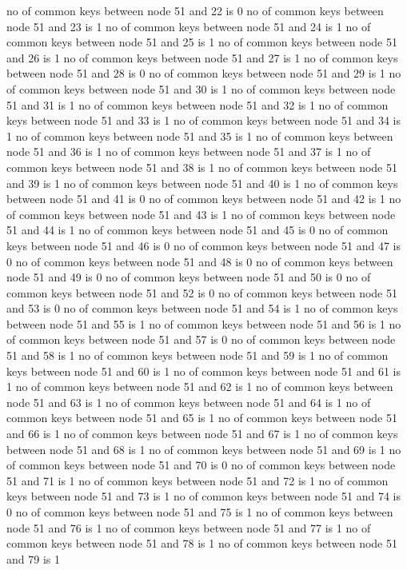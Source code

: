 no of common keys between node 51 and 22 is 0
no of common keys between node 51 and 23 is 1
no of common keys between node 51 and 24 is 1
no of common keys between node 51 and 25 is 1
no of common keys between node 51 and 26 is 1
no of common keys between node 51 and 27 is 1
no of common keys between node 51 and 28 is 0
no of common keys between node 51 and 29 is 1
no of common keys between node 51 and 30 is 1
no of common keys between node 51 and 31 is 1
no of common keys between node 51 and 32 is 1
no of common keys between node 51 and 33 is 1
no of common keys between node 51 and 34 is 1
no of common keys between node 51 and 35 is 1
no of common keys between node 51 and 36 is 1
no of common keys between node 51 and 37 is 1
no of common keys between node 51 and 38 is 1
no of common keys between node 51 and 39 is 1
no of common keys between node 51 and 40 is 1
no of common keys between node 51 and 41 is 0
no of common keys between node 51 and 42 is 1
no of common keys between node 51 and 43 is 1
no of common keys between node 51 and 44 is 1
no of common keys between node 51 and 45 is 0
no of common keys between node 51 and 46 is 0
no of common keys between node 51 and 47 is 0
no of common keys between node 51 and 48 is 0
no of common keys between node 51 and 49 is 0
no of common keys between node 51 and 50 is 0
no of common keys between node 51 and 52 is 0
no of common keys between node 51 and 53 is 0
no of common keys between node 51 and 54 is 1
no of common keys between node 51 and 55 is 1
no of common keys between node 51 and 56 is 1
no of common keys between node 51 and 57 is 0
no of common keys between node 51 and 58 is 1
no of common keys between node 51 and 59 is 1
no of common keys between node 51 and 60 is 1
no of common keys between node 51 and 61 is 1
no of common keys between node 51 and 62 is 1
no of common keys between node 51 and 63 is 1
no of common keys between node 51 and 64 is 1
no of common keys between node 51 and 65 is 1
no of common keys between node 51 and 66 is 1
no of common keys between node 51 and 67 is 1
no of common keys between node 51 and 68 is 1
no of common keys between node 51 and 69 is 1
no of common keys between node 51 and 70 is 0
no of common keys between node 51 and 71 is 1
no of common keys between node 51 and 72 is 1
no of common keys between node 51 and 73 is 1
no of common keys between node 51 and 74 is 0
no of common keys between node 51 and 75 is 1
no of common keys between node 51 and 76 is 1
no of common keys between node 51 and 77 is 1
no of common keys between node 51 and 78 is 1
no of common keys between node 51 and 79 is 1
